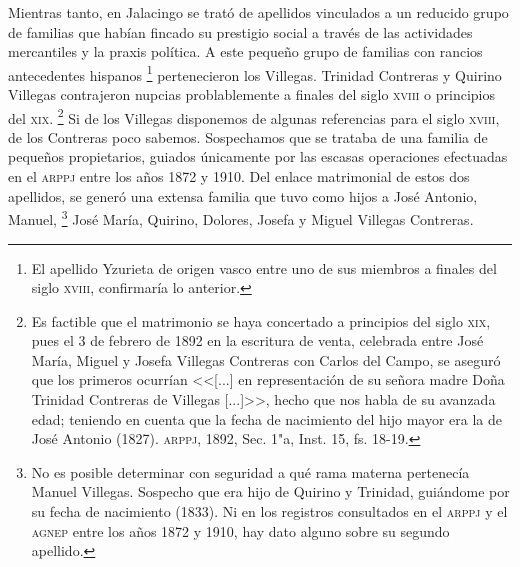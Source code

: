 \documentclass[14pt,twoside,final]{extbook} %
\let\oldfootnote\footnote
\renewcommand\footnote[1]{%
\oldfootnote{\hspace{1mm}#1}}
\begin{document}
Mientras tanto, en Jalacingo se trató de apellidos vinculados a un reducido grupo de familias que habían fincado su prestigio social a través de las actividades mercantiles y la praxis política. A este pequeño grupo de familias con rancios antecedentes hispanos\footnote{El apellido Yzurieta de origen vasco entre uno de sus miembros a finales del siglo \textsc{xviii}, confirmaría lo anterior.} pertenecieron los Villegas. Trinidad Contreras y Quirino Villegas contrajeron nupcias problablemente a finales del siglo \textsc{xviii} o principios del \textsc{xix}.\footnote{Es factible que el matrimonio se haya concertado a principios del siglo \textsc{xix}, pues el 3 de febrero de 1892 en la escritura de venta, celebrada entre José María, Miguel y Josefa Villegas Contreras con Carlos del Campo, se aseguró que los primeros ocurrían <<[...] en representación de su señora madre Doña Trinidad Contreras de Villegas [...]>>, hecho que nos habla de su avanzada edad; teniendo en cuenta que la fecha de nacimiento del hijo mayor era la de José Antonio (1827). \textsc{arppj}, 1892, Sec. 1"a, Inst. 15, fs. 18-19.} Si de los Villegas disponemos de algunas referencias para el siglo \textsc{xviii}, de los Contreras poco sabemos. Sospechamos que se trataba de una familia de pequeños propietarios, guiados únicamente por las escasas operaciones efectuadas en el \textsc{arppj} entre los años 1872 y 1910. Del enlace matrimonial de estos dos apellidos, se generó una extensa familia que tuvo como hijos a José Antonio, Manuel,\footnote{No es posible determinar con seguridad a qué rama materna pertenecía Manuel Villegas. Sospecho que era hijo de Quirino y Trinidad, guiándome por su fecha de nacimiento (1833). Ni en los registros consultados en el \textsc{arppj} y el \textsc{agnep} entre los años 1872 y 1910, hay dato alguno sobre su segundo apellido.} José María, Quirino, Dolores, Josefa y Miguel Villegas Contreras.
\end{document}
